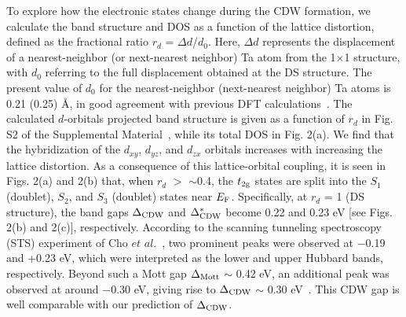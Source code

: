 \documentclass[aps,prl,twocolumn,showpacs,byrevtex]{revtex4}
\begin{document}
To explore how the electronic states change during the CDW formation, we calculate the band structure and DOS as a function of the lattice distortion, defined as the fractional ratio $r_d$ = ${\Delta}d$/$d_0$. Here, ${\Delta}d$ represents the displacement of a nearest-neighbor (or next-nearest neighbor) Ta atom from the 1${\times}$1 structure, with $d_0$ referring to the full displacement obtained at the DS structure. The present value of $d_0$ for the nearest-neighbor (next-nearest neighbor) Ta atoms is 0.21 (0.25) {\AA}, in good agreement with previous DFT calculations~\cite{zhang2014prb}. The calculated $d$-orbitals projected band structure is given as a function of $r_d$ in Fig. S2 of the Supplemental Material~\cite{SM}, while its total DOS in Fig. 2(a). We find that the hybridization of the $d_{xy}$, $d_{yz}$, and $d_{zx}$ orbitals increases with increasing the lattice distortion. As a consequence of this lattice-orbital coupling, it is seen in Figs. 2(a) and 2(b) that, when $r_d$ $>$ ${\sim}$0.4, the $t_{\rm 2g}$ states are split into the $S_1$ (doublet), $S_2$, and $S_3$ (doublet) states near $E_{\rm F}$. Specifically, at $r_d$ = 1 (DS structure), the band gaps ${\Delta}_{\rm CDW}$ and ${\Delta}^{*}_{\rm CDW}$ become 0.22 and 0.23 eV [see Figs. 2(b) and 2(c)], respectively. According to the scanning tunneling spectroscopy (STS) experiment of Cho $et$ $al$.~\cite{Yeom}, two prominent peaks were observed at $-$0.19 and +0.23 eV, which were interpreted as the lower and upper Hubbard bands, respectively. Beyond such a Mott gap ${\Delta}_{\rm Mott}$ ${\sim}$ 0.42 eV, an additional peak was observed at around $-$0.30 eV, giving rise to ${\Delta}_{\rm CDW}$ ${\sim}$ 0.30 eV~\cite{Yeom}. This CDW gap is well comparable with our prediction of ${\Delta}_{\rm CDW}$.
\end{document}

